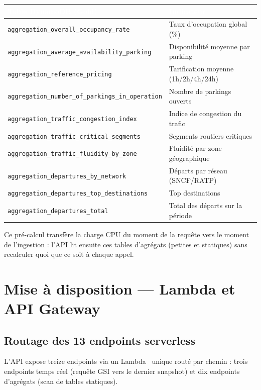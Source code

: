 \documentclass[11pt]{article}
\newcommand{\thead}[1]{\textbf{\textcolor{white}{#1}}}
\begin{document}
\begin{center}\begin{tabularx}{\linewidth}{|l|>{\raggedright\arraybackslash}X|}
\hline
\rowcolor{tableHeader}
\thead{Table DynamoDB (Gold)} & \thead{Indicateur} \\
\hline
\texttt{aggregation\_overall\_occupancy\_rate} & Taux d'occupation global (\%) \\
\hline
\texttt{aggregation\_average\_availability\_parking} & Disponibilité moyenne par parking \\
\hline
\texttt{aggregation\_reference\_pricing} & Tarification moyenne (1h/2h/4h/24h) \\
\hline
\texttt{aggregation\_number\_of\_parkings\_in\_operation} & Nombre de parkings ouverts \\
\hline
\texttt{aggregation\_traffic\_congestion\_index} & Indice de congestion du trafic \\
\hline
\texttt{aggregation\_traffic\_critical\_segments} & Segments routiers critiques \\
\hline
\texttt{aggregation\_traffic\_fluidity\_by\_zone} & Fluidité par zone géographique \\
\hline
\texttt{aggregation\_departures\_by\_network} & Départs par réseau (SNCF/RATP) \\
\hline
\texttt{aggregation\_departures\_top\_destinations} & Top destinations \\
\hline
\texttt{aggregation\_departures\_total} & Total des départs sur la période \\
\hline
\end{tabularx}\end{center}

Ce pré-calcul transfère la charge CPU du moment de la requête vers le moment de
l'ingestion : l'API lit ensuite ces tables d'agrégats (petites et statiques) sans
recalculer quoi que ce soit à chaque appel.

\section{Mise à disposition --- Lambda et API Gateway}

\subsection{Routage des 13 endpoints serverless}

L'API expose treize endpoints via un Lambda~\cite{lambda} unique routé par chemin :
trois endpoints temps réel (requête GSI vers le dernier snapshot) et dix endpoints
d'agrégats (scan de tables statiques).
\end{document}
